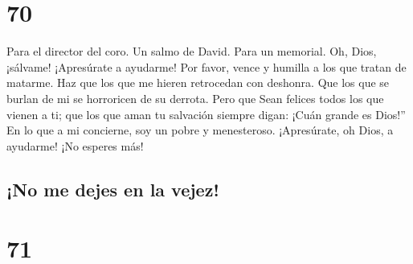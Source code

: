 \hypertarget{section-69}{%
\section{70}\label{section-69}}

Para el director del coro. Un salmo de David. Para un memorial.
 Oh, Dios, ¡sálvame! ¡Apresúrate a ayudarme! 
Por favor, vence y humilla a los que tratan de matarme. Haz que los que
me hieren retrocedan con deshonra.  Que los que se burlan de
mi se horroricen de su derrota.  Pero que Sean felices todos
los que vienen a ti; que los que aman tu salvación siempre digan: ¡Cuán
grande es Dios!''  En lo que a mi concierne, soy un pobre y
menesteroso. ¡Apresúrate, oh Dios, a ayudarme! ¡No esperes más!

\hypertarget{no-me-dejes-en-la-vejez}{%
\subsection{¡No me dejes en la vejez!}\label{no-me-dejes-en-la-vejez}}

\hypertarget{section-70}{%
\section{71}\label{section-70}}

